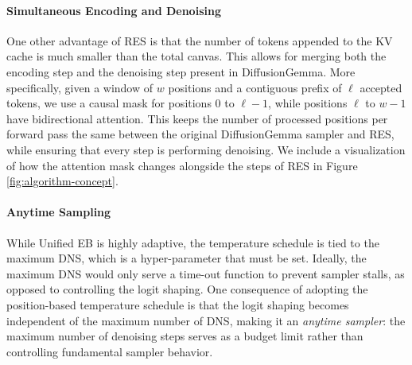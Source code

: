 \paragraph{Simultaneous Encoding and Denoising}
One other advantage of RES is that the number of tokens appended to the KV cache is much smaller than the total canvas. This allows for merging both the encoding step and the denoising step present in DiffusionGemma.
More specifically, given a window of $w$ positions and a contiguous prefix of $\ell$ accepted tokens, we use a causal mask for positions $0$ to $\ell-1$, while positions $\ell$ to $w-1$ have bidirectional attention.
This keeps the number of processed positions per forward pass the same between the original DiffusionGemma sampler and RES, while ensuring that every step is performing denoising.
We include a visualization of how the attention mask changes alongside the steps of RES in Figure \ref{fig:algorithm-concept}.

\paragraph{Anytime Sampling}
While Unified EB is highly adaptive, the temperature schedule is tied to the maximum DNS, which is a hyper-parameter that must be set.
Ideally, the maximum DNS would only serve a time-out function to prevent sampler stalls, as opposed to controlling the logit shaping.
One consequence of adopting the position-based temperature schedule is that the logit shaping becomes independent of the maximum number of DNS, making it an \textit{anytime sampler}: the maximum number of denoising steps serves as a budget limit rather than controlling fundamental sampler behavior.
